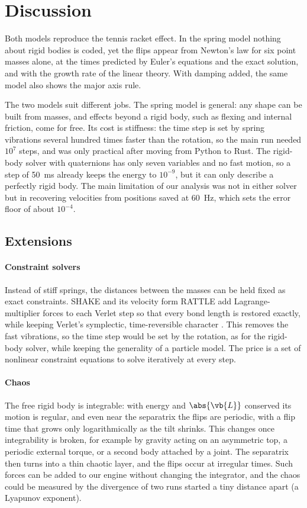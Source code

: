 \section{Discussion}
\label{sec:discussion}
Both models reproduce the tennis racket effect.
In the spring model nothing about rigid bodies is coded, yet the flips appear from Newton's law for six point masses alone, at the times predicted by Euler's equations and the exact solution, and with the growth rate of the linear theory.
With damping added, the same model also shows the major axis rule.

The two models suit different jobs.
The spring model is general: any shape can be built from masses, and effects beyond a rigid body, such as flexing and internal friction, come for free.
Its cost is stiffness: the time step is set by spring vibrations several hundred times faster than the rotation, so the main run needed $10^7$ steps, and was only practical after moving from Python to Rust.
The rigid-body solver with quaternions has only seven variables and no fast motion, so a step of \SI{50}{ms} already keeps the energy to $10^{-9}$, but it can only describe a perfectly rigid body.
The main limitation of our analysis was not in either solver but in recovering velocities from positions saved at \SI{60}{Hz}, which sets the error floor of about $10^{-4}$.

\subsection{Extensions}
\label{sec:extensions}
\paragraph{Constraint solvers}
Instead of stiff springs, the distances between the masses can be held fixed as exact constraints.
SHAKE \cite{shake1977} and its velocity form RATTLE \cite{rattle1983} add Lagrange-multiplier forces to each Verlet step so that every bond length is restored exactly, while keeping Verlet's symplectic, time-reversible character \cite{hairer2006}.
This removes the fast vibrations, so the time step would be set by the rotation, as for the rigid-body solver, while keeping the generality of a particle model.
The price is a set of nonlinear constraint equations to solve iteratively at every step.

\paragraph{Chaos}
The free rigid body is integrable: with energy and $\abs{\vb{L}}$ conserved its motion is regular, and even near the separatrix the flips are periodic, with a flip time that grows only logarithmically as the tilt shrinks.
This changes once integrability is broken, for example by gravity acting on an asymmetric top, a periodic external torque, or a second body attached by a joint.
The separatrix then turns into a thin chaotic layer, and the flips occur at irregular times.
Such forces can be added to our engine without changing the integrator, and the chaos could be measured by the divergence of two runs started a tiny distance apart (a Lyapunov exponent).

